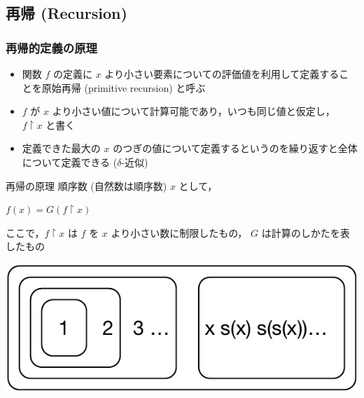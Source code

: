 \subsection{再帰 (Recursion)}
\begin{frame}
\frametitle{再帰的定義の原理}
  \begin{itemize}
\item 関数 $f$ の定義に $x$ より小さい要素についての評価値を利用して定義することを原始再帰 (primitive recursion) と呼ぶ
\item $f$ が $x$ より小さい値について計算可能であり，いつも同じ値と仮定し， \(f\upharpoonright x\) と書く
\item 定義できた最大の $x$ のつぎの値について定義するというのを繰り返すと全体について定義できる (\(\delta\)-近似)
  \end{itemize}
  \begin{block}{再帰の原理}
\scriptsize
順序数 (自然数は順序数) \(x\) として，
    \begin{center}
\(f(x)=G(f\upharpoonright x)\)
    \end{center}
ここで，\(f\upharpoonright x\) は \(f\) を \(x\) より小さい数に制限したもの， $G$ は計算のしかたを表したもの
  \end{block}
  \begin{center}
\includegraphics[scale=0.5]{./Figure/elementaryCS-2nd-figRecursion.pdf}
  \end{center}
\end{frame}

